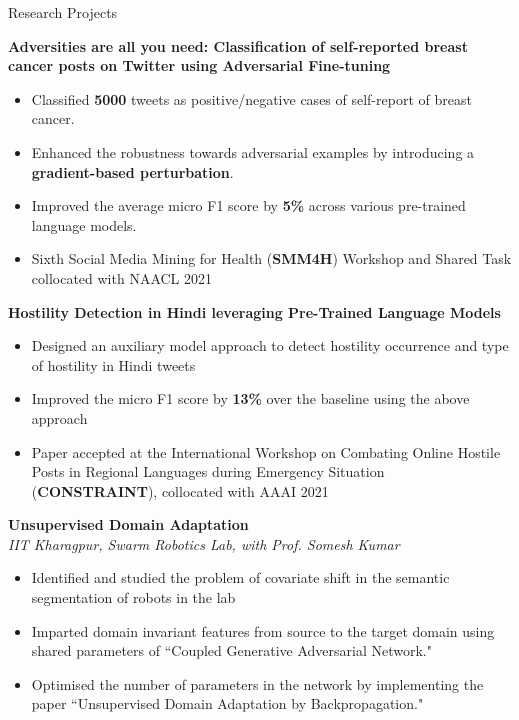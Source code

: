 \documentclass[40]{resume} %
\begin{document}

\begin{rSection}{Research Projects}
\vspace{6pt}

{\bf Adversities are all you need: Classification of self-reported breast cancer posts on Twitter using Adversarial Fine-tuning} \hfill{ } 

\begin{itemize}
\item Classified \textbf{5000} tweets as positive/negative cases of self-report of breast cancer.
\item Enhanced the robustness towards adversarial examples by introducing a \textbf{gradient-based perturbation}.
\item Improved the average micro F1 score by \textbf{5\%} across various pre-trained language models.
\item Sixth Social Media Mining for Health (\textbf{SMM4H}) Workshop and Shared Task collocated with NAACL 2021
\end{itemize}
\vspace{0.2cm}
{\bf Hostility Detection in Hindi leveraging Pre-Trained Language Models
} \hfill { } 

\begin{itemize}
\item Designed an auxiliary model approach to detect hostility occurrence and type of hostility in Hindi tweets
\item Improved the micro F1 score by \textbf{13\%} over the baseline using the above approach
\item Paper accepted at the International Workshop on Combating Online Hostile Posts in Regional Languages during Emergency Situation (\textbf{CONSTRAINT}), collocated with AAAI 2021
\end{itemize}

\vspace{0.2cm}
{\bf Unsupervised Domain Adaptation} \hfill { } 
\\ \textit{IIT Kharagpur, Swarm Robotics Lab, with Prof. Somesh Kumar} \hfill { \em }
\begin{itemize}
\item Identified and studied the problem of covariate shift in the semantic segmentation of robots in the lab
\item Imparted domain invariant features from source to the target domain using shared parameters of ``Coupled Generative Adversarial Network."
\item Optimised the number of parameters in the network by implementing the paper ``Unsupervised Domain Adaptation by Backpropagation."
\end{itemize}
\end{rSection}
\end{document}
